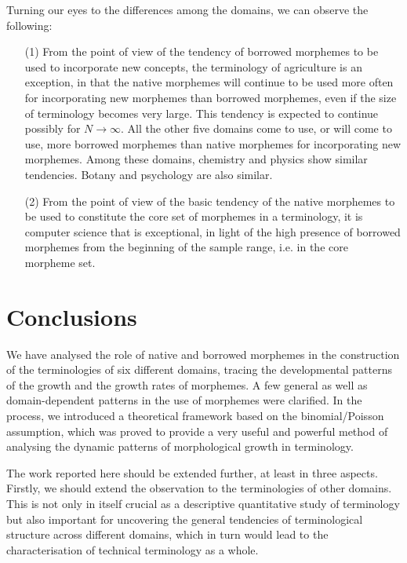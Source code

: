 Turning our eyes to the differences among the domains, we can observe the
following:
\begin{enumerate}
\setlength{\itemsep}{0mm}
\item[(1)] From the point of view of the tendency of borrowed
morphemes to be used to incorporate new concepts, the terminology
of agriculture is an exception, in that the native morphemes will continue
to be used more often for incorporating new morphemes than borrowed morphemes,
even if the size of terminology becomes very large. This tendency is
expected to continue possibly for $N \rightarrow \infty$. All the other
five domains come to use, or will come to use, more borrowed morphemes than
native morphemes for incorporating new morphemes. Among these domains,
chemistry and physics show similar tendencies. Botany and psychology are
also similar.
\item[(2)] From the point of view of the basic tendency of the native
morphemes to be used to constitute the core set of morphemes in a terminology,
it is computer science that is exceptional, in light of the high presence of
borrowed morphemes from the beginning of the sample range, i.e. in the
core morpheme set.
\end{enumerate}


\section{Conclusions}

We have analysed the role of native and borrowed morphemes in the
construction of the terminologies of six different domains, tracing
the developmental patterns of the growth and the growth rates of
morphemes. A few general as well as domain-dependent patterns in
the use of morphemes were clarified. In the process, we introduced
a theoretical framework based on the binomial/Poisson assumption,
which was proved to provide a very useful and powerful method of analysing
the dynamic patterns of morphological growth in terminology.

The work reported here should be extended further, at least in
three aspects. Firstly, we should extend the observation
to the terminologies of other domains. This is not only in itself
crucial as a descriptive quantitative study of terminology but
also important for uncovering the general tendencies of terminological
structure across different domains, which in turn would lead to
the characterisation of technical terminology as a whole.

